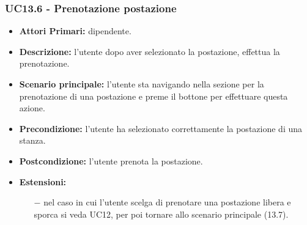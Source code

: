 \subsubsection{ UC13.6 - Prenotazione postazione }
\begin{itemize}
	\item\textbf{Attori Primari:} dipendente.
	\item\textbf{Descrizione:} l’utente dopo aver selezionato la postazione, effettua la prenotazione. 
	\item\textbf{Scenario principale:} l’utente sta navigando nella sezione per la prenotazione di una postazione
	e preme il bottone per effettuare questa azione.
	\item\textbf{Precondizione:} l’utente ha selezionato correttamente la postazione di una stanza.
	\item\textbf{Postcondizione:} l'utente prenota la postazione.
	\item\textbf{Estensioni:}
	\begin{itemize}
		\item[$-$] nel caso in cui l'utente scelga di prenotare una postazione libera e sporca si veda UC12,
		per poi tornare allo scenario principale (13.7).
	\end{itemize}
\end{itemize}
